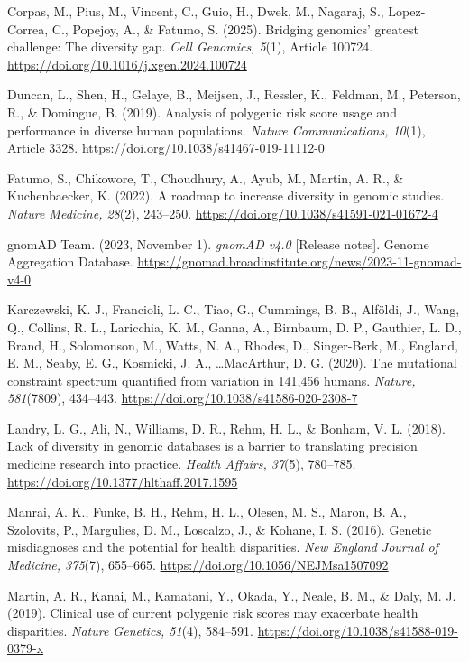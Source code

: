 \documentclass[12pt]{article}
\begin{document}
Corpas, M., Pius, M., Vincent, C., Guio, H., Dwek, M., Nagaraj, S., Lopez-Correa, C., Popejoy, A., \& Fatumo, S. (2025). Bridging genomics' greatest challenge: The diversity gap. \emph{Cell Genomics, 5}(1), Article 100724. \url{https://doi.org/10.1016/j.xgen.2024.100724}

Duncan, L., Shen, H., Gelaye, B., Meijsen, J., Ressler, K., Feldman, M., Peterson, R., \& Domingue, B. (2019). Analysis of polygenic risk score usage and performance in diverse human populations. \emph{Nature Communications, 10}(1), Article 3328. \url{https://doi.org/10.1038/s41467-019-11112-0}

Fatumo, S., Chikowore, T., Choudhury, A., Ayub, M., Martin, A. R., \& Kuchenbaecker, K. (2022). A roadmap to increase diversity in genomic studies. \emph{Nature Medicine, 28}(2), 243--250. \url{https://doi.org/10.1038/s41591-021-01672-4}

gnomAD Team. (2023, November 1). \emph{gnomAD v4.0} [Release notes]. Genome Aggregation Database. \url{https://gnomad.broadinstitute.org/news/2023-11-gnomad-v4-0}

Karczewski, K. J., Francioli, L. C., Tiao, G., Cummings, B. B., Alf\"oldi, J., Wang, Q., Collins, R. L., Laricchia, K. M., Ganna, A., Birnbaum, D. P., Gauthier, L. D., Brand, H., Solomonson, M., Watts, N. A., Rhodes, D., Singer-Berk, M., England, E. M., Seaby, E. G., Kosmicki, J. A., \ldots MacArthur, D. G. (2020). The mutational constraint spectrum quantified from variation in 141,456 humans. \emph{Nature, 581}(7809), 434--443. \url{https://doi.org/10.1038/s41586-020-2308-7}

Landry, L. G., Ali, N., Williams, D. R., Rehm, H. L., \& Bonham, V. L. (2018). Lack of diversity in genomic databases is a barrier to translating precision medicine research into practice. \emph{Health Affairs, 37}(5), 780--785. \url{https://doi.org/10.1377/hlthaff.2017.1595}

Manrai, A. K., Funke, B. H., Rehm, H. L., Olesen, M. S., Maron, B. A., Szolovits, P., Margulies, D. M., Loscalzo, J., \& Kohane, I. S. (2016). Genetic misdiagnoses and the potential for health disparities. \emph{New England Journal of Medicine, 375}(7), 655--665. \url{https://doi.org/10.1056/NEJMsa1507092}

Martin, A. R., Kanai, M., Kamatani, Y., Okada, Y., Neale, B. M., \& Daly, M. J. (2019). Clinical use of current polygenic risk scores may exacerbate health disparities. \emph{Nature Genetics, 51}(4), 584--591. \url{https://doi.org/10.1038/s41588-019-0379-x}
\end{document}
